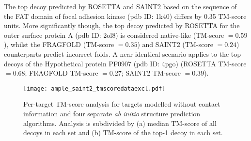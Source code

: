 The top decoy predicted by ROSETTA and SAINT2 based on the sequence of the FAT domain of focal adhesion kinase (\gls{pdb} ID: 1k40) differs by 0.35 TM-score units. More significantly though, the top decoy predicted by ROSETTA for the outer surface protein A (\gls{pdb} ID: 2ol8) is considered native-like (TM-score $=0.59$), whilst the FRAGFOLD (TM-score $=0.35$) and SAINT2 (TM-score $=0.24$) counterparts predict incorrect folds. A near-identical scenario applies to the top decoys of the Hypothetical protein PF0907 (\gls{pdb} ID: 4pgo) (ROSETTA TM-score $=0.68$; FRAGFOLD TM-score $=0.27$; SAINT2 TM-score $=0.39$).

\begin{figure}[H]
    \centering
    \texttt{[image: ample\_saint2\_tmscoredataexcl.pdf]}
    \caption[Per-target TM-score analysis for four modelling algorithms without contacts]{Per-target TM-score analysis for targets modelled without contact information and four separate \textit{ab initio} structure prediction algorithms. Analysis is subdivided by (a) median TM-score of all decoys in each set and (b) TM-score of the top-1 decoy in each set.}
    \label{fig:ample_saint2_tmscoredataexcl}
\end{figure}


